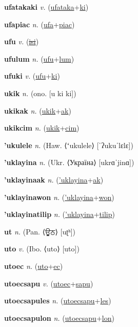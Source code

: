 \textbf{\hypertarget{ufatakaki}{ufatakaki}} \textit{v.} (\hyperlink{ufataka}{ufataka}+\allowbreak \hyperlink{ki}{ki})


\textbf{\hypertarget{ufapiac}{ufapiac}} \textit{n.} (\hyperlink{ufa}{ufa}+\allowbreak \hyperlink{piac}{piac})


\textbf{\hypertarget{ufu}{ufu}} \textit{v.} (\hyperlink{isi}{\sout{isi}})


\textbf{\hypertarget{ufulum}{ufulum}} \textit{n.} (\hyperlink{ufu}{ufu}+\allowbreak \hyperlink{lum}{lum})


\textbf{\hypertarget{ufuki}{ufuki}} \textit{v.} (\hyperlink{ufu}{ufu}+\allowbreak \hyperlink{ki}{ki})


\textbf{\hypertarget{ukik}{ukik}} \textit{n.} (ono. [u ki ki])


\textbf{\hypertarget{ukikak}{ukikak}} \textit{n.} (\hyperlink{ukik}{ukik}+\allowbreak \hyperlink{ak}{ak})


\textbf{\hypertarget{ukikcim}{ukikcim}} \textit{n.} (\hyperlink{ukik}{ukik}+\allowbreak \hyperlink{cim}{cim})


\textbf{\hypertarget{'ukulele}{'ukulele}} \textit{n.} (Haw. ⟨ʻukulele⟩ [ˈʔukuˈlɛlɛ])


\textbf{\hypertarget{'uklayina}{'uklayina}} \textit{n.} (Ukr. ⟨Україна⟩ [ukrɑˈjinɑ])


\textbf{\hypertarget{'uklayinaak}{'uklayinaak}} \textit{n.} (\hyperlink{'uklayina}{'uklayina}+\allowbreak \hyperlink{ak}{ak})


\textbf{\hypertarget{'uklayinawon}{'uklayinawon}} \textit{n.} (\hyperlink{'uklayina}{'uklayina}+\allowbreak \hyperlink{won}{won})


\textbf{\hypertarget{'uklayinatilip}{'uklayinatilip}} \textit{n.} (\hyperlink{'uklayina}{'uklayina}+\allowbreak \hyperlink{tilip}{tilip})


\textbf{\hypertarget{ut}{ut}} \textit{n.} (Pan. ⟨{\gurmukhi{}ਊਠ}⟩ [uʈʰ])


\textbf{\hypertarget{uto}{uto}} \textit{v.} (Ibo. ⟨uto⟩ [uto])


\textbf{\hypertarget{utoec}{utoec}} \textit{n.} (\hyperlink{uto}{uto}+\allowbreak \hyperlink{ec}{ec})


\textbf{\hypertarget{utoecsapu}{utoecsapu}} \textit{v.} (\hyperlink{utoec}{utoec}+\allowbreak \hyperlink{sapu}{sapu})


\textbf{\hypertarget{utoecsapules}{utoecsapules}} \textit{n.} (\hyperlink{utoecsapu}{utoecsapu}+\allowbreak \hyperlink{les}{les})


\textbf{\hypertarget{utoecsapulon}{utoecsapulon}} \textit{n.} (\hyperlink{utoecsapu}{utoecsapu}+\allowbreak \hyperlink{lon}{lon})


